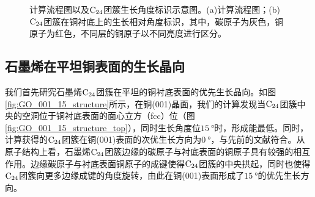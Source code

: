 \begin{figure}[htb]
    \caption{计算流程图以及$\rm{C_{24}}$团簇生长角度标识示意图。(a)计算流程图；(b)$\rm{C_{24}}$团簇在铜衬底上的生长相对角度标识，其中，碳原子为灰色，铜原子为红色，不同层的铜原子以不同亮度进行区分。}
    \label{fig:GO_calculateFlow_relativeAngle}
\end{figure}

\subsection{石墨烯在平坦铜表面的生长晶向}
我们首先研究石墨烯$\rm{C_{24}}$团簇在平坦的铜衬底表面的优先生长晶向。如图\ref{fig:GO_001_15_structure}所示，在铜(001)晶面，我们的计算发现当$\rm{C_{24}}$团簇中央的空洞位于铜衬底表面的面心立方（fcc）位（图\ref{fig:GO_001_15_structure_top}），同时生长角度位$\SI{15}{\degree}$时，形成能最低。同时，计算获得的$\rm{C_{24}}$团簇在铜(001)表面的次优生长方向为$\SI{0}{\degree}$，与先前的文献符合。从原子结构上看，石墨烯$\rm{C_{24}}$团簇边缘的碳原子与衬底表面的铜原子具有较强的相互作用。边缘碳原子与衬底表面铜原子的成键使得$\rm{C_{24}}$团簇的中央拱起，同时也使得$\rm{C_{24}}$团簇向更多边缘成键的角度旋转，由此在铜(001)表面形成了$\SI{15}{\degree}$的优先生长方向。

